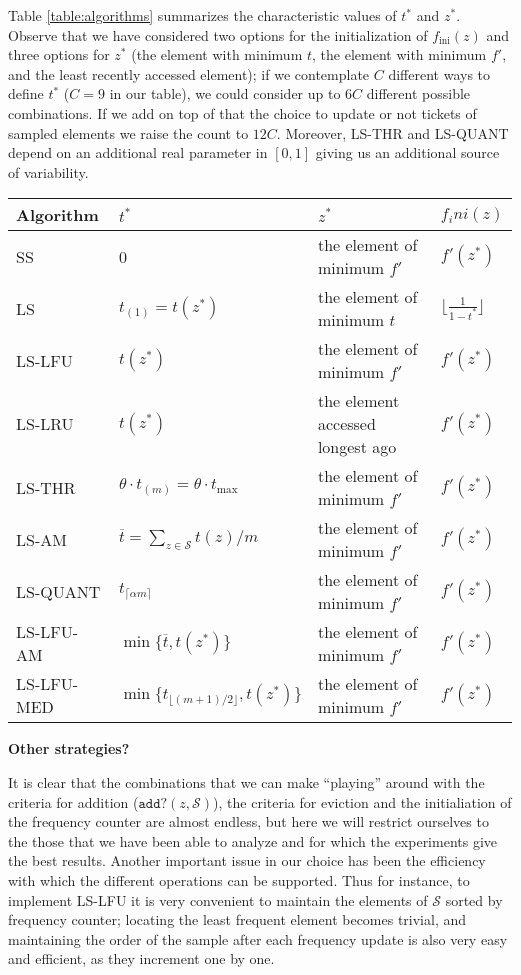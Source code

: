 \documentclass{article}
\begin{document}
Table \ref{table:algorithms} summarizes the characteristic values of
$t^\ast$ and $z^\ast$. Observe that we have considered two options for
the initialization of $f_\text{ini}(z)$ and three options for $z^\ast$
(the element with minimum $t$, the element with minimum $f'$, and the
least recently accessed element); if we contemplate $C$ different ways
to define $t^\ast$ ($C=9$ in our table), we could consider up to $6C$
different possible combinations. If we add on top of that the choice
to update or not tickets of sampled elements we raise the count to
$12C$. Moreover, LS-THR and LS-QUANT depend on an additional real parameter
in $[0,1]$ giving us an additional source of variability.

\begin{table}
  \begin{tabular}{llll}
    Algorithm & $t^\ast$ & $z^\ast$ & $f_ini(z)$ \\\hline\hline
    SS        & 0       & the element of minimum $f'$ & $f'(z^\ast)$ \\
    LS        & $t_{(1)}=t(z^\ast)$ & the element of minimum $t$ & $\lfloor\frac{1}{1-t^\ast}\rfloor$ \\
    LS-LFU    & $t(z^\ast)$ & the element of minimum $f'$ & $f'(z^\ast)$ \\
    LS-LRU    & $t(z^\ast)$ & the element accessed longest ago & $f'(z^\ast)$ \\
    LS-THR    & $\theta\cdot t_{(m)}=\theta\cdot t_\text{max}$ & the element of minimum $f'$ & $f'(z^\ast)$ \\
    LS-AM     & $\overline{t}=\sum_{z\in\mathcal{S}}t(z)/m$ & the element of minimum $f'$ & $f'(z^\ast)$ \\
    LS-QUANT  & $t_{\lceil\alpha m\rceil}$ & the element of minimum $f'$ & $f'(z^\ast)$ \\
    LS-LFU-AM & $\min\{\overline{t},t(z^\ast)\}$ & the element of minimum $f'$ & $f'(z^\ast)$ \\
    LS-LFU-MED & $\min\{t_{\lfloor(m+1)/2\rfloor},t(z^\ast)\}$ &
    the element of minimum $f'$ & $f'(z^\ast)$
  \end{tabular}
\end{table}


{\color{red}\textbf{Other strategies?}}

It is clear that the combinations that we can make ``playing'' around
with the criteria for addition ($\texttt{add?}(z,\mathcal{S})$), the
criteria for eviction and the initialiation of the frequency counter
are almost endless, but here we will restrict ourselves to the those
that we have been able to analyze and for which the experiments give
the best results. Another important issue in our choice has been the
efficiency with which the different operations can be supported.
Thus for instance, to implement LS-LFU it is very convenient to
maintain the elements of $\mathcal{S}$ sorted by frequency counter; locating
the least frequent element becomes trivial, and maintaining the order of the
sample after each frequency update is also very easy and efficient, as
they increment one by one.
\end{document}
